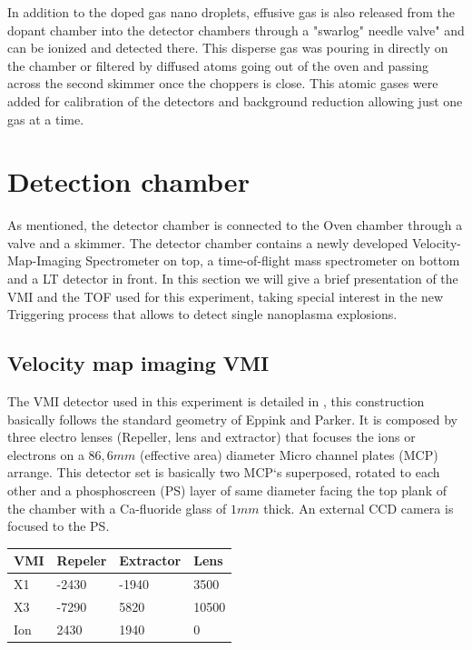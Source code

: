 In addition to the doped gas nano droplets, effusive gas is also released from the dopant chamber into the detector chambers through a "swarlog" needle valve" and can be ionized and detected there. This disperse gas was pouring in directly on the chamber or filtered by diffused atoms going out of the oven and passing across the second skimmer once the choppers is close. This atomic gases were added for calibration of the detectors and background reduction allowing just one gas at a time.

\section{Detection chamber}

As mentioned, the detector chamber is connected to the Oven chamber through a valve and a skimmer. The detector chamber contains a newly developed Velocity-Map-Imaging
Spectrometer on top, a time-of-flight mass spectrometer on bottom and a LT detector in front. In this section we will give a brief presentation of  the VMI and the TOF used for this experiment, taking special interest in the new Triggering process that allows to detect single nanoplasma explosions. 
 
\subsection{Velocity map imaging VMI}

The VMI detector used in this experiment is detailed in \cite{schomas_compact_2017}, this construction basically follows the standard geometry of Eppink and Parker\cite{eppink_velocity_1997}. It is composed by three electro lenses (Repeller, lens and extractor) that focuses the ions or electrons on a $86,6mm$ (effective area) diameter Micro channel plates (MCP) arrange. This detector set is basically  two MCP`s superposed,  rotated to each other and a phosphoscreen (PS) layer of same diameter facing the top plank of the chamber with a Ca-fluoride glass of $1mm$ thick. An external CCD camera is focused to the PS. 

\begin{table}[]
\centering
\begin{tabular}{|l|l|l|l|}
\hline
\rowcolor[HTML]{EFEFEF} 
VMI & Repeler & Extractor & Lens  \\ \hline
X1  & -2430   & -1940     & 3500  \\ \hline
X3  & -7290   & 5820      & 10500 \\ \hline
Ion & 2430    & 1940      & 0     \\ \hline
\end{tabular}
\end{table}

